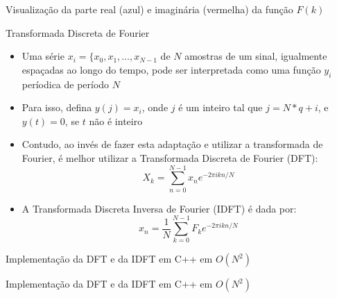 \begin{frame}[fragile]{Visualização da parte real (azul) e imaginária (vermelha) da função $F(k)$}

    \begin{figure}
        \centering

    \end{figure}

\end{frame}

\begin{frame}[fragile]{Transformada Discreta de Fourier}

    \begin{itemize}
        \item Uma série $x_i = \{ x_0, x_1, \ldots, x_{N - 1}$ de $N$ amostras de um sinal,
            igualmente espaçadas ao longo do tempo,
            pode ser interpretada como uma função $y_i$ períodica de período $N$

        \item Para isso, defina $y(j) = x_i$, onde $j$ é um inteiro tal que $j = N*q + i$, e
            $y(t) = 0$, se $t$ não é inteiro

        \item Contudo, ao invés de fazer esta adaptação e utilizar a transformada de Fourier, é
            melhor utilizar a Transformada Discreta de Fourier (DFT):
        \[
            X_k = \sum_{n = 0}^{N - 1} x_ne^{-2\pi ikn/N}
        \]

        \item A Transformada Discreta Inversa de Fourier (IDFT) é dada por:
        \[
            x_n = \frac{1}{N}\sum_{k = 0}^{N - 1} F_ke^{-2\pi ikn/N}
        \]

    \end{itemize}

\end{frame}

\begin{frame}[fragile]{Implementação da DFT e da IDFT em C++ em $O(N^2)$}
\end{frame}

\begin{frame}[fragile]{Implementação da DFT e da IDFT em C++ em $O(N^2)$}
\end{frame}
